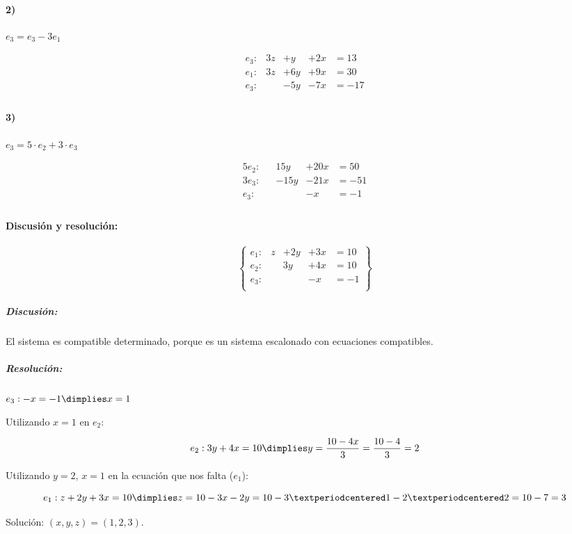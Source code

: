 \documentclass[palatino,nosec]{Docencia}
\begin{document}
\begin{problem}
\paragraph{2)} $e_3 = e_3-3e_1$

\[
\begin{array}{rcccl}
e_3: & 3z&+y  &+2x&=13\\
e_1: & 3z&+6y &+9x&=30\\
\hline
e_3: &   &-5y &-7x&=-17\\
\end{array}
\]	



\paragraph{3)} $e_3=5·e_2+3·e_3$

\[
\begin{array}{rcccl}
5e_2: & &15y&+20x&=50\\
3e_3: & &-15y&-21x&=-51\\
\hline
e_3: &&&-x&=-1\\
\end{array}
\]	


\paragraph{Discusión y resolución:}

\[
\left\{\begin{array}{lccccc}
e_1: & z&+ 2y&+3x &=10\\
e_2: & &3y&+4x&=10\\
e_3: &&&-x&=-1\\
\end{array}\right\}
\]

\subparagraph{Discusión:} El sistema es compatible determinado, porque es un sistema escalonado con ecuaciones compatibles.


\subparagraph{Resolución:}

$e_3: -x=-1 \dimplies x=1$

Utilizando $x=1$ en $e_2$:


\[
	e_2: 3y+4x=10 \dimplies y=\frac{10-4x}{3} = \frac{10-4}{3} = 2
\]

Utilizando $y=2$, $x=1$ en la ecuación que nos falta ($e_1$):

\[
e_1: z+2y+3x = 10 \dimplies z = 10-3x-2y = 10-3·1-2·2 = 10-7 = 3
\]


Solución: $(x,y,z) = (1,2,3)$.


\end{problem}
\end{document}

